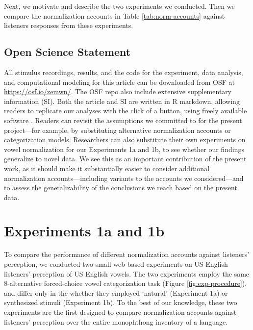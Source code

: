 \documentclass[preprint]{JASA}
\begin{document}
\linenumbers

Next, we motivate and describe the two experiments we conducted. Then we compare the normalization accounts in Table \ref{tab:norm-accounts} against listeners responses from these experiments.

\subsection{Open Science Statement}\label{open-science-statement}

All stimulus recordings, results, and the code for the experiment, data analysis, and computational modeling for this article can be downloaded from OSF at \url{https://osf.io/zemwn/}. The OSF repo also include extensive supplementary information (SI). Both the article and SI are written in R markdown, allowing readers to replicate our analyses with the click of a button, using freely available software \citep{R-base, RStudio}. Readers can revisit the assumptions we committed to for the present project---for example, by substituting alternative normalization accounts or categorization models. Researchers can also substitute their own experiments on vowel normalization for our Experiments 1a and 1b, to see whether our findings generalize to novel data. We see this as an important contribution of the present work, as it should make it substantially easier to consider additional normalization accounts---including variants to the accounts we considered---and to assess the generalizability of the conclusions we reach based on the present data.

\section{Experiments 1a and 1b}\label{sec:experiment}

To compare the performance of different normalization accounts against listeners' perception, we conducted two small web-based experiments on US English listeners' perception of US English vowels. The two experiments employ the same 8-alternative forced-choice vowel categorization task (Figure \ref{fig:exp-procedure}), and differ only in the whether they employed `natural' (Experiment 1a) or synthesized stimuli (Experiment 1b). To the best of our knowledge, these two experiments are the first designed to compare normalization accounts against listeners' perception over the entire monophthong inventory of a language.
\end{document}
